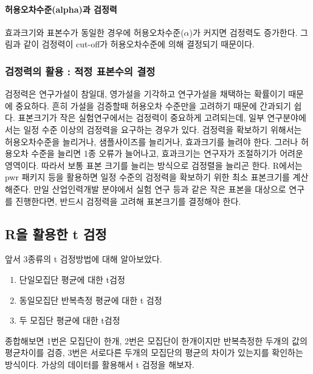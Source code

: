 \documentclass[
]{book}
\providecommand{\tightlist}{%
  \setlength{\itemsep}{0pt}\setlength{\parskip}{0pt}}
\begin{document}
\paragraph{허용오차수준(alpha)과 검정력}\label{uxd5c8uxc6a9uxc624uxcc28uxc218uxc900alphauxacfc-uxac80uxc815uxb825}

효과크기와 표본수가 동일한 경우에 허용오차수준(\(\alpha\))가 커지면 검정력도 증가한다. 그림과 같이 검정력이 cut-off가 허용오차수준에 의해 결정되기 때문이다.

\subsubsection{검정력의 활용 : 적정 표본수의 결정}\label{uxac80uxc815uxb825uxc758-uxd65cuxc6a9-uxc801uxc815-uxd45cuxbcf8uxc218uxc758-uxacb0uxc815}

검정력은 연구가설이 참일대, 영가설을 기각하고 연구가설을 채택하는 확률이기 때문에 중요하다. 흔히 가설을 검증할때 허용오차 수준만을 고려하기 때문에 간과되기 쉽다. 표본크기가 작은 실험연구에서는 검정력이 중요하게 고려되는데, 일부 연구분야에서는 일정 수준 이상의 검정력을 요구하는 경우가 있다. 검정력을 확보하기 위해서는 허용오차수준을 늘리거나, 샘플사이즈를 늘리거나, 효과크기를 늘려야 한다. 그러나 허용오차 수준을 늘리면 1종 오류가 늘어나고, 효과크기는 연구자가 조절하기가 어려운 영역이다. 따라서 보통 표본 크기를 늘리는 방식으로 검정렬을 늘리곤 한다. R에서는 pwr 패키지 등을 활용하면 일정 수준의 검정력을 확보하기 위한 최소 표본크기를 계산해준다. 만일 산업인력개발 분야에서 실험 연구 등과 같은 작은 표본을 대상으로 연구를 진행한다면, 반드시 검정력을 고려해 표본크기를 결정해야 한다.

\subsection{R을 활용한 t 검정}\label{ruxc744-uxd65cuxc6a9uxd55c-t-uxac80uxc815}

앞서 3종류의 t 검정방법에 대해 알아보았다.

\begin{enumerate}
\def\labelenumi{\arabic{enumi}.}
\tightlist
\item
  단일모집단 평균에 대한 t검정
\item
  동일모집단 반복측정 평균에 대한 t 검정
\item
  두 모집단 평균에 대한 t검정
\end{enumerate}

종합해보면 1번은 모집단이 한개, 2번은 모집단이 한개이지만 반복측정한 두개의 값의 평균차이를 검증, 3번은 서로다른 두개의 모집단의 평균의 차이가 있는지를 확인하는 방식이다. 가상의 데이터를 활용해서 t 검정을 해보자.
\end{document}
